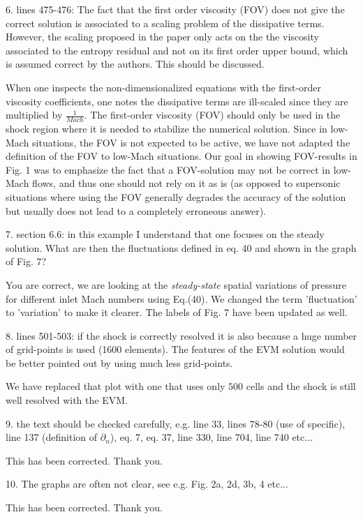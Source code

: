 \documentclass{article}
\begin{document}
{
\color{blue}
6. lines 475-476: The fact that the first order viscosity (FOV)  does not give the correct solution is associated to a scaling problem of the dissipative terms. However, the scaling proposed in the paper only acts on the the viscosity associated to the entropy residual and not on its first order upper bound, which is assumed correct by the authors. This should be discussed.
}

When one inspects the non-dimensionalized equations with the first-order viscosity coefficients, one notes the dissipative terms are ill-scaled since they are multiplied by $\frac{1}{Mach}$. The first-order viscosity (FOV) should only be used in the shock region where it is needed to stabilize the numerical solution. Since in low-Mach situations, the FOV is not expected to be active, we have not adapted the definition of the FOV to low-Mach situations. Our goal in showing FOV-results in Fig. 1 was to emphasize the fact that a FOV-solution may not be correct in low-Mach flows, and thus one should not rely on it as is (as opposed to supersonic situations where using the FOV generally degrades the accuracy of the solution but usually does not lead to a completely erroneous answer).
\bigskip


{
\color{blue}
7. section 6.6: in this example I understand that one focuses on the steady solution. What are then the fluctuations defined in eq. 40 and shown in the graph of Fig. 7?
}

You are correct, we are looking at the \emph{steady-state} spatial variations of pressure for different inlet Mach numbers using Eq.(40).
We changed the term 'fluctuation' to 'variation' to make it clearer.  The labels of Fig. 7 have been updated as well. 
\bigskip


{
\color{blue}
8. lines 501-503: if the shock is correctly resolved it is also because a huge number of grid-points is used (1600 elements). The features  of the EVM solution would be better pointed out by using much less grid-points.
}

We have replaced that plot with one that uses only $500$ cells and the shock is still well resolved with the EVM.
\bigskip


{
\color{blue}
9. the text should be checked carefully, e.g. line 33, lines 78-80 (use of specific), line 137 (definition of $\partial_n$), eq. 7, eq. 37, line 330, line 704, line 740 etc...
}

This has been corrected. Thank you.
\bigskip


{
\color{blue}
10. The graphs are often not clear, see e.g. Fig. 2a, 2d, 3b, 4 etc...
}

This has been corrected. Thank you.
\bigskip
\end{document}
